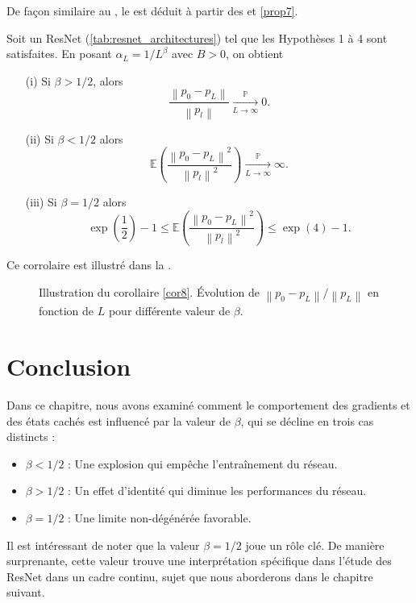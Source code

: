 De façon similaire au , le  est déduit à partir des  et \ref{prop7}.

\begin{cor}\label{cor8}
    Soit un ResNet (\ref{tab:resnet_architectures}) tel que les Hypothèses 1 à 4 sont satisfaites. En posant $ \alpha _L = 1 / L^\beta $ avec $ B > 0 $, on obtient 
    \begin{enumerate}
        \item [(i)] Si $ \beta > 1/2 $, alors 
        \[
            \frac{\left\| p_0 - p_L \right\| }{\left\| p_l \right\|  } \xrightarrow[L \to \infty]{\mathbb{P}} 0
        .\]
        \item [(ii)] Si $ \beta < 1/2 $ alors 
        \[
            \mathbb{E}\left(\frac{\left\| p_0 - p_L \right\| ^2 }{\left\| p_l \right\| ^2 }\right) \xrightarrow[L \to \infty]{\mathbb{P}} \infty
        .\]
        \item [(iii)] Si $ \beta = 1/2 $ alors
        \[
            \exp (\frac{1}{2}) - 1 \leqslant \mathbb{E}\left(\frac{\left\| p_0 - p_L \right\| ^2 }{\left\| p_l \right\| ^2 }\right) \leqslant \exp (4) - 1
        .\]
    \end{enumerate}
    Ce corrolaire est illustré dans la .
\end{cor}

\begin{figure}[H]
    \centering
    \caption{Illustration du corollaire \ref{cor8}. Évolution de $ \left\| p_0 - p_L \right\| / \left\| p_L \right\| $ en fonction de $ L $ pour différente valeur de $ \beta  $.}
    \label{fig:cor8}
\end{figure}

\section{Conclusion}\label{ccl_chap2}
Dans ce chapitre, nous avons examiné comment le comportement des gradients et des états cachés est influencé par la valeur de $\beta$, qui se décline en trois cas distincts :
\begin{itemize}
    \item $\beta < 1/2$ : Une explosion qui empêche l'entraînement du réseau.
    \item $\beta > 1/2$ : Un effet d'identité qui diminue les performances du réseau.
    \item $\beta = 1/2$ : Une limite non-dégénérée favorable.
\end{itemize}
Il est intéressant de noter que la valeur $\beta = 1/2$ joue un rôle clé. De manière surprenante, cette valeur trouve une interprétation spécifique dans l'étude des ResNet dans un cadre continu, sujet que nous aborderons dans le chapitre suivant.
